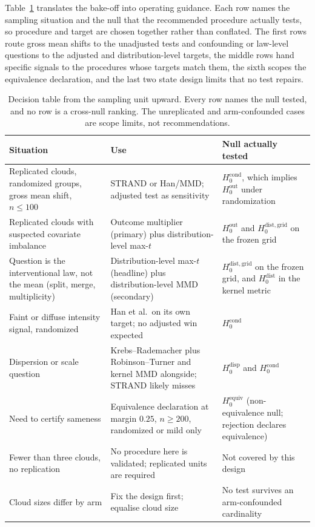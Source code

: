 Table~\ref{tab:decision} translates the bake-off into operating guidance. Each row names the sampling situation and the null that the recommended procedure actually tests, so procedure and target are chosen together rather than conflated. The first rows route gross mean shifts to the unadjusted tests and confounding or law-level questions to the adjusted and distribution-level targets, the middle rows hand specific signals to the procedures whose targets match them, the sixth scopes the equivalence declaration, and the last two state design limits that no test repairs.

\begin{table}[H]
\centering
\small
\begin{tabular}{>{\raggedright\arraybackslash}p{5.3cm}>{\raggedright\arraybackslash}p{4.2cm}>{\raggedright\arraybackslash}p{5.0cm}}
\toprule
Situation & Use & Null actually tested \\
\midrule
Replicated clouds, randomized groups, gross mean shift, $n \le 100$ & STRAND or Han/MMD; adjusted test as sensitivity & $H_0^{\mathrm{cond}}$, which implies $H_0^{\mathrm{out}}$ under randomization \\
Replicated clouds with suspected covariate imbalance & Outcome multiplier (primary) plus distribution-level max-$t$ & $H_0^{\mathrm{out}}$ and $H_0^{\mathrm{dist,grid}}$ on the frozen grid \\
Question is the interventional law, not the mean (split, merge, multiplicity) & Distribution-level max-$t$ (headline) plus distribution-level MMD (secondary) & $H_0^{\mathrm{dist,grid}}$ on the frozen grid, and $H_0^{\mathrm{dist}}$ in the kernel metric \\
Faint or diffuse intensity signal, randomized & Han et al.\ on its own target; no adjusted win expected & $H_0^{\mathrm{cond}}$ \\
Dispersion or scale question & Krebs--Rademacher plus Robinson--Turner and kernel MMD alongside; STRAND likely misses & $H_0^{\mathrm{disp}}$ and $H_0^{\mathrm{cond}}$ \\
Need to certify sameness & Equivalence declaration at margin $0.25$, $n \ge 200$, randomized or mild only & $H_0^{\mathrm{equiv}}$ (non-equivalence null; rejection declares equivalence) \\
Fewer than three clouds, no replication & No procedure here is validated; replicated units are required & Not covered by this design \\
Cloud sizes differ by arm & Fix the design first; equalise cloud size & No test survives an arm-confounded cardinality \\
\bottomrule
\end{tabular}
\caption{Decision table from the sampling unit upward. Every row names the null tested, and no row is a cross-null ranking. The unreplicated and arm-confounded cases are scope limits, not recommendations.}
\label{tab:decision}
\end{table}

